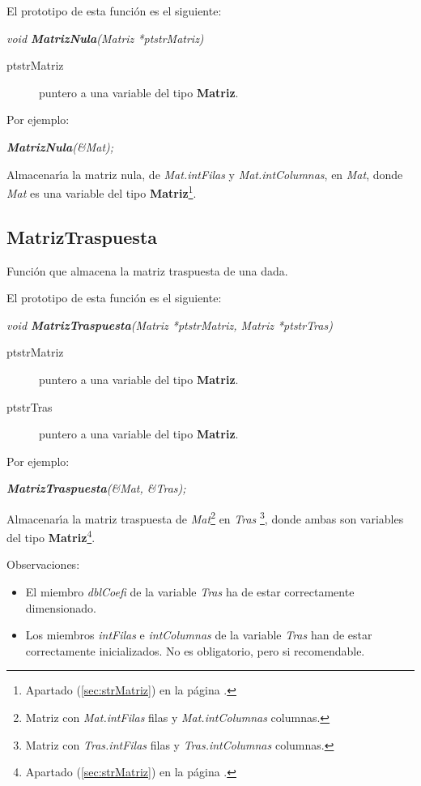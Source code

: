El prototipo de esta funci\'on es el siguiente:

\begin{center}
\emph{void \textbf{MatrizNula}(Matriz *ptstrMatriz)}
\end{center}

\begin{description}
\item[ptstrMatriz] puntero a una variable del tipo \textbf{Matriz}.
\end{description}

Por ejemplo:

\begin{center}
\emph{\textbf{MatrizNula}(\&Mat);}
\end{center}

Almacenar\'{\i}a la matriz nula, de \emph{Mat.intFilas} y 
\emph{Mat.intColumnas}, en \emph{Mat}, donde \emph{Mat} es una variable del
tipo \textbf{Matriz}\footnote{Apartado (\ref{sec:strMatriz}) en la p\'agina
\pageref{sec:strMatriz}.}.

\newpage

\subsection{MatrizTraspuesta}
Funci\'on que almacena la matriz traspuesta de una dada.\newline

El prototipo de esta funci\'on es el siguiente:

\begin{center}
\emph{void \textbf{MatrizTraspuesta}(Matriz *ptstrMatriz, Matriz *ptstrTras)} 
\end{center}

\begin{description}
\item[ptstrMatriz] puntero a una variable del tipo \textbf{Matriz}.
\item[ptstrTras] puntero a una variable del tipo \textbf{Matriz}.
\end{description}

Por ejemplo:

\begin{center}
\emph{\textbf{MatrizTraspuesta}(\&Mat, \&Tras);}
\end{center}

Almacenar\'{\i}a la matriz traspuesta de \emph{Mat}\footnote{Matriz con
\emph{Mat.intFilas} filas y \emph{Mat.intColumnas} columnas.} en \emph{Tras}%
\footnote{Matriz con \emph{Tras.intFilas} filas y \emph{Tras.intColumnas} 
columnas.}, donde ambas son variables del tipo \textbf{Matriz}\footnote{%
Apartado (\ref{sec:strMatriz}) en la p\'agina \pageref{sec:strMatriz}.}.\newline

Observaciones:

\begin{itemize}
\item El miembro \emph{dblCoefi} de la variable \emph{Tras} ha de estar 
correctamente dimensionado.
\item Los miembros \emph{intFilas} e \emph{intColumnas} de la variable 
\emph{Tras} han de estar correctamente inicializados. No es obligatorio, pero
si recomendable.
\end{itemize}
